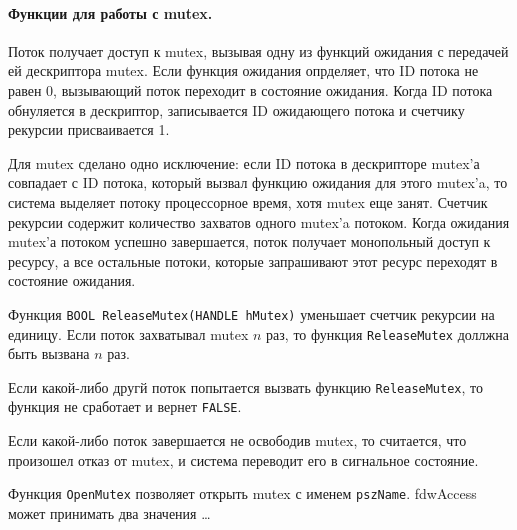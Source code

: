 \paragraph{Функции для работы с mutex.}\mbox{}\par
Поток получает доступ к mutex, вызывая одну из функций ожидания с передачей ей
дескриптора mutex. Если функция ожидания опрделяет, что ID потока не равен 0,
вызывающий поток переходит в состояние ожидания. Когда ID потока обнуляется в
дескриптор, записывается ID ожидающего потока и счетчику рекурсии присваивается
1.

Для mutex сделано одно исключение: если ID потока в дескрипторе mutex'а
совпадает с ID потока, который вызвал функцию ожидания для этого mutex'a, то
система выделяет потоку процессорное время, хотя mutex еще занят. Счетчик
рекурсии содержит количество захватов одного mutex'a потоком. Когда ожидания
mutex'а потоком успешно завершается, поток получает монопольный доступ к
ресурсу, а все остальные потоки, которые запрашивают этот ресурс переходят в
состояние ожидания.

Функция \verb!BOOL ReleaseMutex(HANDLE hMutex)! уменьшает счетчик рекурсии на
единицу. Если поток захватывал mutex $n$ раз, то функция \verb!ReleaseMutex!
доллжна быть вызвана $n$ раз. 

Если какой-либо другй поток попытается вызвать функцию \verb!ReleaseMutex!, то
функция не сработает и вернет \verb!FALSE!. 

Если какой-либо поток завершается не освободив mutex, то считается, что
произошел отказ от mutex, и система переводит его в сигнальное состояние.

Функция \verb!OpenMutex! позволяет открыть mutex с именем \verb!pszName!.
fdwAccess может принимать два значения \dots
